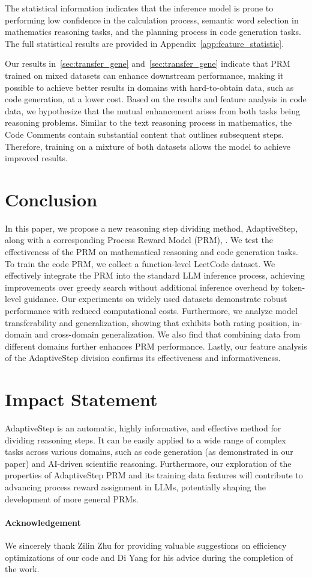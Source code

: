 The statistical information indicates that the inference model is prone to performing low confidence in the calculation process, semantic word selection in mathematics reasoning tasks, and the planning process in code generation tasks. 
The full statistical results are provided in Appendix~\ref{app:feature_statistic}.


Our results in~\ref{sec:transfer_gene} and~\ref{sec:transfer_gene} indicate that PRM trained on mixed datasets can enhance downstream performance, making it possible to achieve better results in domains with hard-to-obtain data, such as code generation, at a lower cost. Based on the results and feature analysis in code data, we hypothesize that the mutual enhancement arises from both tasks being reasoning problems. Similar to the text reasoning process in mathematics, the Code Comments contain substantial content that outlines subsequent steps. Therefore, training on a mixture of both datasets allows the model to achieve improved results.

\section{Conclusion}

In this paper, we propose a new reasoning step dividing method, AdaptiveStep, along with a corresponding Process Reward Model (PRM), \MethodName. We test the effectiveness of the PRM on mathematical reasoning and code generation tasks. To train the code PRM, we collect a function-level LeetCode dataset. We effectively integrate the PRM into the standard LLM inference process, achieving improvements over greedy search without additional inference overhead by token-level guidance. Our experiments on widely used datasets demonstrate robust performance with reduced computational costs. Furthermore, we analyze model transferability and generalization, showing that \MethodName \hspace{1pt} exhibits both rating position, in-domain and cross-domain generalization. We also find that combining data from different domains further enhances PRM performance. Lastly, our feature analysis of the AdaptiveStep division confirms its effectiveness and informativeness.



\section{Impact Statement}

AdaptiveStep is an automatic, highly informative, and effective method for dividing reasoning steps. It can be easily applied to a wide range of complex tasks across various domains, such as code generation (as demonstrated in our paper) and AI-driven scientific reasoning. Furthermore, our exploration of the properties of AdaptiveStep PRM and its training data features will contribute to advancing process reward assignment in LLMs, potentially shaping the development of more general PRMs.

\paragraph{Acknowledgement} We sincerely thank Zilin Zhu for providing valuable suggestions on efficiency optimizations of our code and Di Yang for his advice during the completion of the work.